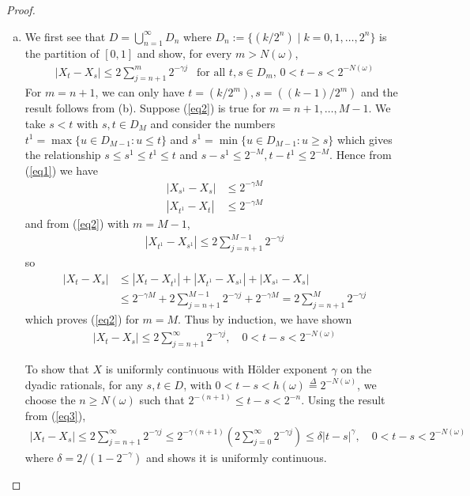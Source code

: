 \documentclass[a4paper,12pt]{article}
\theoremstyle{definition}
\begin{document}
\begin{proof}
\begin{enumerate}[(a)]
\item
We first see that $D = \bigcup_{n=1}^{\infty}D_n$ where $D_n:=\{(k/2^n)\mid k=0,1,\ldots, 2^n\}$ is the partition of $[0,1]$ and show, for every $m>N(\omega)$, 
\begin{align}
|X_t - X_s| \leq 2 \sum_{j=n+1}^{m}2^{-\gamma j} ~~\text{ for all $t,s \in D_m$, }0 < t-s < 2^{-N(\omega)} \label{eq2}
\end{align}
For $m=n+1$, we can only have $t = (k/2^m), s = ((k-1)/2^m)$ and the result follows from (b). Suppose (\ref{eq2}) is true for $m = n+1, \ldots, M-1$. We take $s<t$ with $s,t \in D_{M}$ and consider the numbers $t^1 = \max \{u \in D_{M-1}: u \leq t\}$ and $s^1=\min\{u \in D_{M-1}:u \geq s\}$ which gives the relationship $s \leq s^1\leq t^1 \leq t$ and  $s-s^1 \leq 2^{-M},  t-t^1\leq 2^{-M}$. Hence from (\ref{eq1}) we have 
\begin{align*}
|X_{s^1}-X_s| &\leq 2^{-\gamma M}\\
|X_{t^1}-X_t| &\leq 2^{-\gamma M}
\end{align*}
and from (\ref{eq2}) with $m=M-1$, 
\begin{align*}
|X_{t^1}-X_{s^1}| \leq 2 \sum_{j=n+1}^{M-1}2^{-\gamma j}
\end{align*}
so
\begin{align*}
|X_t-X_s|&\leq |X_t-X_{t^1}|+|X_{t^1}-X_{s^1}|+|X_{s^1}-X_s|\\
&\leq 2^{-\gamma M} +2 \sum_{j=n+1}^{M-1}2^{-\gamma j} + 2^{-\gamma M}=2 \sum_{j=n+1}^{M}2^{-\gamma j}
\end{align*}
which proves (\ref{eq2}) for $m=M$. Thus by induction, we have shown
\begin{align}
|X_{t}-X_{s}| \leq 2 \sum_{j=n+1}^{\infty}2^{-\gamma j},\quad 0<t-s<2^{-N(\omega)}\label{eq3}
\end{align}



To show that $X$ is uniformly continuous with H\"{o}lder exponent $\gamma$ on the dyadic rationals, for any $s, t \in D$, with $0< t-s<h(\omega) \overset{\Delta}{=}2^{-N(\omega)}$, we choose the $n \geq N(\omega)$ such that $2^{-(n+1)}\leq t-s<2^{-n}$. Using the result from (\ref{eq3}),
\begin{align}
|X_t-X_s| \leq 2 \sum_{j=n+1}^{\infty}2^{-\gamma j}\leq 2^{-\gamma(n+1)}\left(2 \sum_{j=0}^{\infty}2^{-\gamma j}\right) \leq \delta |t-s|^\gamma, \quad 0<t-s<2^{-N(\omega)} \label{eq4}
\end{align}
where $\delta = 2/(1-2^{-\gamma})$ and shows it is uniformly continuous.







\end{enumerate}
\end{proof}
\end{document}
